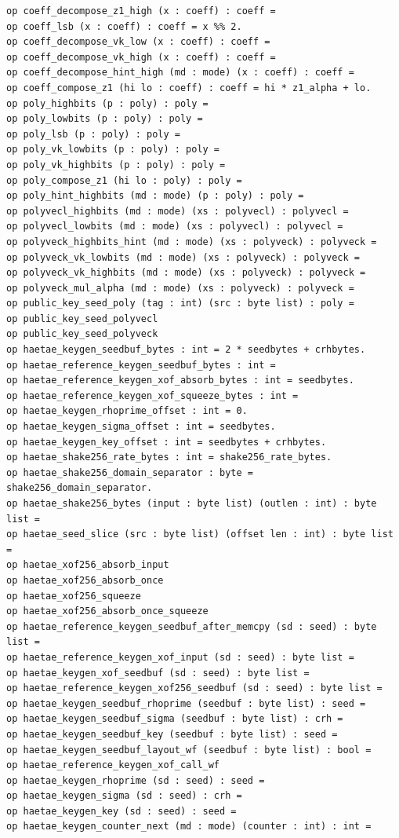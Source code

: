 \begin{lstlisting}[language=EasyCrypt,basicstyle=\ttfamily\tiny]
op coeff_decompose_z1_high (x : coeff) : coeff =
op coeff_lsb (x : coeff) : coeff = x %% 2.
op coeff_decompose_vk_low (x : coeff) : coeff =
op coeff_decompose_vk_high (x : coeff) : coeff =
op coeff_decompose_hint_high (md : mode) (x : coeff) : coeff =
op coeff_compose_z1 (hi lo : coeff) : coeff = hi * z1_alpha + lo.
op poly_highbits (p : poly) : poly =
op poly_lowbits (p : poly) : poly =
op poly_lsb (p : poly) : poly =
op poly_vk_lowbits (p : poly) : poly =
op poly_vk_highbits (p : poly) : poly =
op poly_compose_z1 (hi lo : poly) : poly =
op poly_hint_highbits (md : mode) (p : poly) : poly =
op polyvecl_highbits (md : mode) (xs : polyvecl) : polyvecl =
op polyvecl_lowbits (md : mode) (xs : polyvecl) : polyvecl =
op polyveck_highbits_hint (md : mode) (xs : polyveck) : polyveck =
op polyveck_vk_lowbits (md : mode) (xs : polyveck) : polyveck =
op polyveck_vk_highbits (md : mode) (xs : polyveck) : polyveck =
op polyveck_mul_alpha (md : mode) (xs : polyveck) : polyveck =
op public_key_seed_poly (tag : int) (src : byte list) : poly =
op public_key_seed_polyvecl
op public_key_seed_polyveck
op haetae_keygen_seedbuf_bytes : int = 2 * seedbytes + crhbytes.
op haetae_reference_keygen_seedbuf_bytes : int =
op haetae_reference_keygen_xof_absorb_bytes : int = seedbytes.
op haetae_reference_keygen_xof_squeeze_bytes : int =
op haetae_keygen_rhoprime_offset : int = 0.
op haetae_keygen_sigma_offset : int = seedbytes.
op haetae_keygen_key_offset : int = seedbytes + crhbytes.
op haetae_shake256_rate_bytes : int = shake256_rate_bytes.
op haetae_shake256_domain_separator : byte = shake256_domain_separator.
op haetae_shake256_bytes (input : byte list) (outlen : int) : byte list =
op haetae_seed_slice (src : byte list) (offset len : int) : byte list =
op haetae_xof256_absorb_input
op haetae_xof256_absorb_once
op haetae_xof256_squeeze
op haetae_xof256_absorb_once_squeeze
op haetae_reference_keygen_seedbuf_after_memcpy (sd : seed) : byte list =
op haetae_reference_keygen_xof_input (sd : seed) : byte list =
op haetae_keygen_xof_seedbuf (sd : seed) : byte list =
op haetae_reference_keygen_xof256_seedbuf (sd : seed) : byte list =
op haetae_keygen_seedbuf_rhoprime (seedbuf : byte list) : seed =
op haetae_keygen_seedbuf_sigma (seedbuf : byte list) : crh =
op haetae_keygen_seedbuf_key (seedbuf : byte list) : seed =
op haetae_keygen_seedbuf_layout_wf (seedbuf : byte list) : bool =
op haetae_reference_keygen_xof_call_wf
op haetae_keygen_rhoprime (sd : seed) : seed =
op haetae_keygen_sigma (sd : seed) : crh =
op haetae_keygen_key (sd : seed) : seed =
op haetae_keygen_counter_next (md : mode) (counter : int) : int =

\end{lstlisting}
